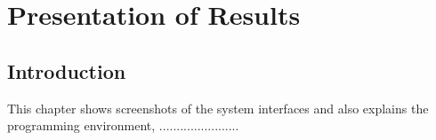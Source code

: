 \chapter{Presentation of Results}

\section{Introduction}
This chapter shows screenshots of the system interfaces and also explains the programming environment, .......................